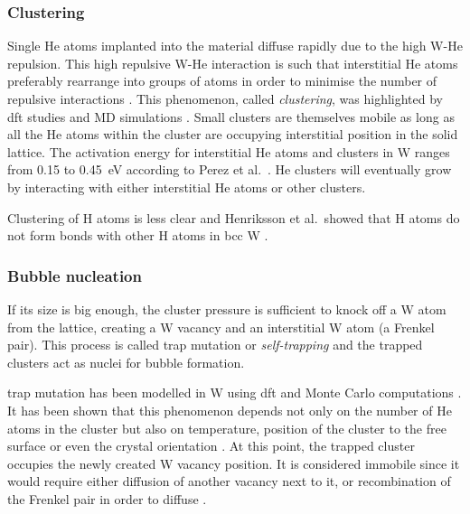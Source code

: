 \subsubsection{Clustering}
Single \gls{He} atoms implanted into the material diffuse rapidly due to the high W-He repulsion.
This high repulsive W-He interaction is such that interstitial \gls{He} atoms preferably rearrange into groups of atoms in order to minimise the number of repulsive interactions .
This phenomenon, called \emph{clustering}, was highlighted by \gls{dft} studies \cite{becquart_density_2009,dunn_rate_2013} and MD simulations \cite{henriksson_molecular_2006}.
Small clusters are themselves mobile as long as all the \gls{He} atoms within the cluster are occupying interstitial position in the solid \gls{lattice}.
The activation energy for interstitial \gls{He} atoms and clusters in \gls{W} ranges from 0.15 to \SI{0.45}{eV} according to Perez et al.\ .
He clusters will eventually grow by interacting with either interstitial \gls{He} atoms or other clusters.

Clustering of \gls{H} atoms is less clear and Henriksson et al.\ showed that \gls{H} atoms do not form bonds with other \gls{H} atoms in \gls{bcc} \gls{W} .

\subsubsection{Bubble nucleation}

If its size is big enough, the cluster pressure is sufficient to knock off a \gls{W} atom from the \gls{lattice}, creating a \gls{W} \gls{vacancy} and an interstitial \gls{W} atom (a \gls{Frenkel pair}).
This process is called \gls{trap mutation} or \emph{\gls{self-trapping}} and the trapped clusters act as nuclei for bubble formation.

\Gls{trap mutation} has been modelled in \gls{W} using \gls{dft}  and Monte Carlo computations .
It has been shown that this phenomenon depends not only on the number of \gls{He} atoms in the cluster but also on temperature, position of the cluster to the free surface or even the crystal orientation .
At this point, the trapped cluster occupies the newly created \gls{W} \gls{vacancy} position.
It is considered immobile since it would require either diffusion of another \gls{vacancy} next to it, or recombination of the Frenkel pair in order to diffuse .

